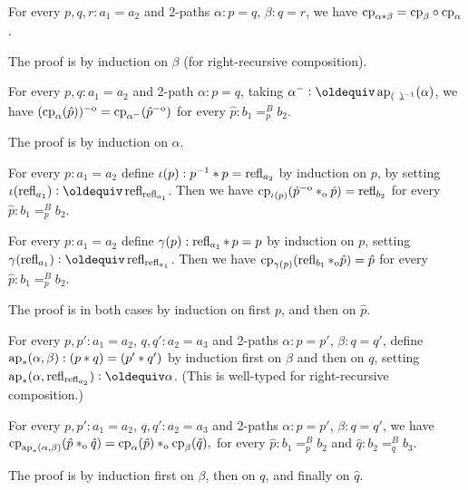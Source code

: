 \documentclass[a4paper,12pt]{amsart}
\begin{document}
\begin{lemma}\label{lem:functorial-change-path}
  For every $p,q,r:a_1=a_2$ and 2-paths $\alpha : p = q$, $\beta : q = r$,
  we have $\mathrm{cp}_{\alpha*\beta}=\mathrm{cp}_{\beta}\circ\mathrm{cp}_{\alpha}$.
\end{lemma}

The proof is by induction on $\beta$ (for right-recursive composition).

\begin{lemma}\label{lem:inv2-change-path}
  For every  $p,q:a_1=a_2$ and 2-path $\alpha : p = q$, taking
  $\alpha^- \defeq \ap{(\blank)^{-1}}(\alpha)$, we have
  $(\mathrm{cp}_{\alpha}(\hat p))^{-\mathrm{o}} = \mathrm{cp}_{\alpha^-}(\hat p^{-\mathrm{o}})$
  for every $\hat p: b_1=^B_p b_2$.
\end{lemma}
The proof is by induction on $\alpha$.

\begin{lemma}\label{lem:invlaw-change-path}
  For every  $p :a_1 = a_2$ define $\iota(p): p^{-1}* p = \mathop{{\mathrm{refl}}_{a_2}}$
  by induction on $p$, by setting $\iota(\refl{a_1})\defeq \refl{\refl{a_1}}$.
  Then we have $\mathrm{cp}_{\iota(p)}(\hat p^{-\mathrm{o}} \mathbin{*_{\mathrm{o}}} {\hat p}) = \mathop{{\mathrm{refl}}_{b_2}}$
  for every $\hat p: b_1=^B_p b_2$.
\end{lemma}

\begin{lemma}\label{lem:unitlaw-change-path}
  For every  $p :a_1 = a_2$ define $\gamma(p): \mathop{{\mathrm{refl}}_{a_1}} *\, p = p$
  by induction on $p$, setting $\gamma(\refl{a_1})\defeq \refl{\refl{a_1}}$.
  Then we have $\mathrm{cp}_{\gamma(p)}(\mathop{{\mathrm{refl}}_{b_1}} \mathbin{*_{\mathrm{o}}} {\hat p}) = \hat p$
  for every $\hat p: b_1=^B_p b_2$.
\end{lemma}

The proof is in both cases by induction on first $p$, and then on $\hat p$.

\begin{definition}\label{lem:compo-ap-ap}
  For every  $p,p':a_1=a_2$, $q,q':a_2=a_3$ and 2-paths
  $\alpha : p = p'$, $\beta : q = q'$, define
  $\mathop{\mathrm{ap}_{*}}(\alpha,\beta): (p* q)=(p'* q')$ by induction
  first on $\beta$ and then on $q$,
  setting $\apc(\alpha,\refl{\refl{a_2}}) \defeq \alpha$.
  (This is well-typed for right-recursive composition.)
\end{definition}

\begin{lemma}\label{lem:compo-change-path}
  For every  $p,p':a_1=a_2$, $q,q':a_2=a_3$ and 2-paths
  $\alpha : p = p'$, $\beta : q = q'$, we have
  $\mathrm{cp}_{\mathop{\mathrm{ap}_{*}}(\alpha,\beta)}(\hat p \mathbin{*_{\mathrm{o}}} \hat q) =
   \mathrm{cp}_{\alpha}(\hat p) \mathbin{*_{\mathrm{o}}}  \mathrm{cp}_{\beta}(\hat q),$
  for every $\hat p: b_1=^B_p b_2$ and $\hat q: b_2=^B_q b_3$.
\end{lemma}
The proof is by induction first on $\beta$, then on $q$, and finally on $\hat q$.
\end{document}
